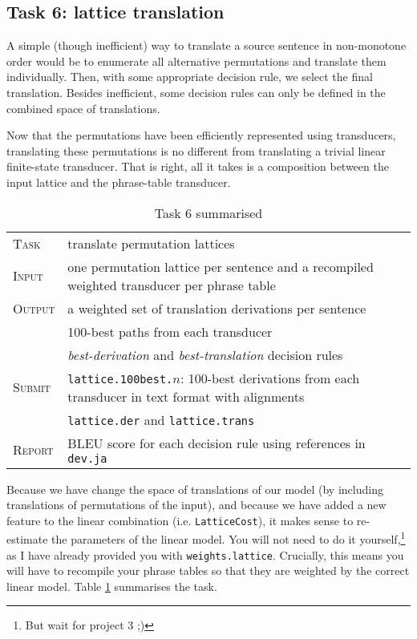 \subsection{Task 6: lattice translation}

A simple (though inefficient) way to translate a source sentence in non-monotone order would be to enumerate all alternative permutations and translate them individually.
Then, with some appropriate decision rule, we select the final translation.
Besides inefficient, some decision rules can only be defined in the combined space of translations.

Now that the permutations have been efficiently represented using transducers, translating these permutations is no different from translating a trivial linear finite-state transducer.
That is right, all it takes is a composition between the input lattice and the phrase-table transducer.


\begin{table}[h]\centering
\begin{tabular}{l p{12cm}}
\textsc{Task}   &  translate permutation lattices\\
\textsc{Input}  &  one permutation lattice per sentence and a recompiled weighted transducer per phrase table\\
\textsc{Output} &  a weighted set of translation derivations per sentence\\
                &  100-best paths from each transducer \\
                & \emph{best-derivation} and \emph{best-translation} decision rules\\
\textsc{Submit} & \texttt{lattice.100best.}$n$: 100-best derivations from each transducer in text format with alignments\\
                & \texttt{lattice.der} and \texttt{lattice.trans} \\  
\textsc{Report} & BLEU score for each decision rule using references in \texttt{dev.ja}\\
\end{tabular}
\caption{\label{tab:task6}Task 6 summarised}
\end{table}


Because we have change the space of translations of our model (by including translations of permutations of the input), and because we have added a new feature to the linear combination (i.e. \texttt{LatticeCost}), it makes sense to re-estimate the parameters of the linear model.
You will not need to do it yourself,\footnote{But wait for project 3 ;)} as I have already provided you with \texttt{weights.lattice}.
Crucially, this means you will have to recompile your phrase tables so that they are weighted by the correct linear model.
Table \ref{tab:task6} summarises the task. 

